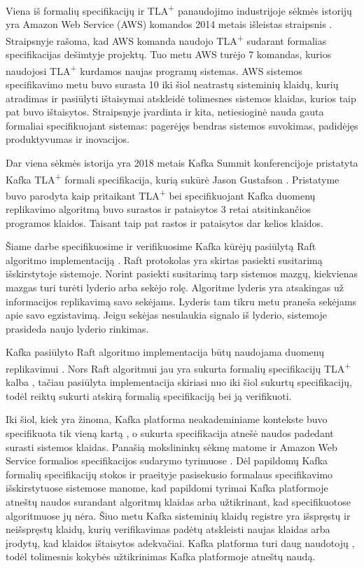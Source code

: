 \documentclass{VUMIFPSmagistrinis}
\begin{document}
		Viena iš formalių specifikacijų ir TLA\textsuperscript{+} panaudojimo industrijoje sėkmės istorijų yra Amazon Web Service (AWS) komandos 2014 metais išleistas straipsnis \cite{newcombe2014use}.
		Straipsnyje rašoma,  kad AWS komanda naudojo TLA\textsuperscript{+} sudarant formalias specifikacijas dešimtyje projektų. Tuo metu AWS turėjo 7 komandas, kurios naudojosi TLA\textsuperscript{+} kurdamos naujas programų sistemas.
		AWS sistemos specifikavimo metu buvo surasta 10 iki šiol neatrastų sisteminių klaidų, kurių atradimas ir pasiūlyti ištaisymai atskleidė tolimesnes sistemos klaidas, kurios taip pat buvo ištaisytos.
		Straipsnyje įvardinta ir kita, netiesioginė nauda gauta formaliai specifikuojant sistemas: pagerėjęs bendras sistemos suvokimas, padidėjęs produktyvumas ir inovacijos.
		

		Dar viena sėkmės istorija yra 2018 metais Kafka Summit konferencijoje pristatyta Kafka TLA\textsuperscript{+} formali specifikacija, kurią sukūrė Jason Gustafson \cite{kfkTla}.
		Pristatyme buvo parodyta kaip pritaikant TLA\textsuperscript{+} bei specifikuojant Kafka duomenų replikavimo algoritmą buvo surastos ir pataisytos 3 retai atsitinkančios programos klaidos.
		Taisant taip pat rastos ir pataisytos dar kelios klaidos.


		Šiame darbe specifikuosime ir verifikuosime Kafka kūrėjų pasiūlytą Raft algoritmo \cite{10.1145/2723872.2723876} implementaciją \cite{raftimpl}.
		Raft protokolas yra skirtas pasiekti susitarimą išskirstytoje sistemoje.
		Norint pasiekti susitarimą tarp sistemos mazgų, kiekvienas mazgas turi turėti lyderio arba sekėjo rolę.
		Algoritme lyderis yra atsakingas už informacijos replikavimą savo sekėjams.
		Lyderis tam tikru metu praneša sekėjams apie savo egzistavimą.
		Jeigu sekėjas nesulaukia signalo iš lyderio, sistemoje prasideda naujo lyderio rinkimas.
		
		
		Kafka pasiūlyto Raft algoritmo implementacija būtų naudojama duomenų replikavimui \cite{raftimpl}.
		Nors Raft algoritmui jau yra sukurta formalių specifikacijų TLA\textsuperscript{+} kalba \cite{rafttla}, tačiau pasiūlyta implementacija skiriasi nuo iki šiol sukurtų specifikacijų, todėl reiktų sukurti atskirą formalią specifikaciją bei ją verifikuoti.


		Iki šiol, kiek yra žinoma, Kafka platforma neakademiniame kontekste buvo specifikuota tik vieną kartą \cite{kfkTla}, o sukurta specifikacija atnešė naudos padedant surasti sistemos klaidas.
		Panašią mokslininkų sėkmę matome ir Amazon Web Service formalios specifikacijos sudarymo tyrimuose \cite{newcombe2014use}.
		Dėl papildomų Kafka formalių specifikacijų stokos ir praeityje pasisekusio formalaus specifikavimo išskirstytuose sistemose manome, kad papildomi tyrimai Kafka platformoje atneštų naudos surandant algoritmų klaidas arba užtikrinant, kad specifikuotose algoritmuose jų nėra.
		Šiuo metu Kafka sisteminių klaidų registre \cite{kfkissue} yra išspręstų ir neišspręstų  klaidų, kurių verifikavimas padėtų atskleisti naujas klaidas arba įrodytų, kad klaidos ištaisytos adekvačiai.
		Kafka platforma turi daug naudotojų \cite{kfk}, todėl tolimesnis kokybės užtikrinimas Kafka platformoje atneštų naudą.
\end{document}
